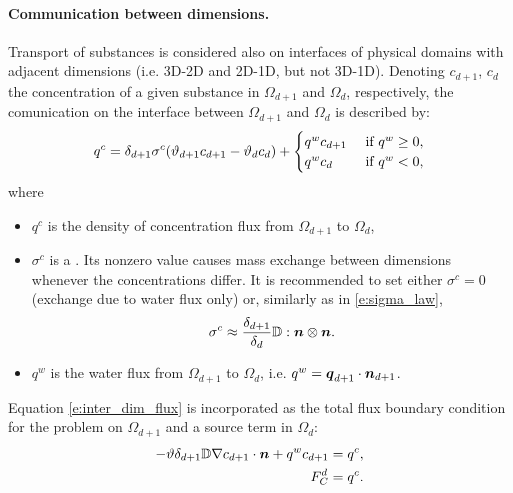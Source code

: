 \paragraph{Communication between dimensions.}
Transport of substances is considered also on interfaces of physical domains with adjacent dimensions (i.e. 3D-2D and 2D-1D, but not 3D-1D).
Denoting $c_{d+1}$, $c_d$ the concentration of a given substance in $\Omega_{d+1}$ and $\Omega_d$, respectively, the comunication on the interface between $\Omega_{d+1}$ and $\Omega_d$ is described by:
\begin{equation}
  \label{e:inter_dim_flux}
  q^c = \delta_{d+1}\sigma^c (\th_{d+1} c_{d+1} - \th_d c_d) + \begin{cases}q^w c_{d+1} & \mbox{ if }q^w\ge 0,\\q^w c_d & \mbox{ if }q^w<0,\end{cases}
\end{equation}
where
\begin{itemize}
\item $q^c$  is the density of concentration flux from $\Omega_{d+1}$ to $\Omega_d$,
\item $\sigma^c$  is a .
Its nonzero value causes mass exchange between dimensions whenever the concentrations differ.
It is recommended to set either $\sigma^c=0$ (exchange due to water flux only) or, similarly as in \eqref{e:sigma_law},
\[
  \sigma^c \approx\frac{\delta_{d+1}}{\delta_d}{{\mathbb{D}}}:\mathbf{\boldsymbol{n}}\otimes\mathbf{\boldsymbol{n}}.
\]
\item $q^w$  is the water flux from $\Omega_{d+1}$ to $\Omega_d$, i.e. $q^w = \mathbf{\boldsymbol{q}}_{d+1}\cdot\mathbf{\boldsymbol{n}}_{d+1}$.
\end{itemize}
Equation \eqref{e:inter_dim_flux} is incorporated as the total flux boundary condition for the problem on $\Omega_{d+1}$ and a source term in $\Omega_d$:
\begin{align}
-\th\delta_{d+1}\D\nabla c_{d+1}\cdot\vc n + q^w c_{d+1} &= q^c,\\
\label{e:FC}
F_C^d &= q^c.
\end{align}


